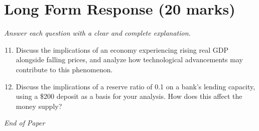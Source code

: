 \documentclass[12pt]{article}
\begin{document}
\section*{Long Form Response (20 marks)}
\textit{Answer each question with a clear and complete explanation.}
\begin{enumerate}[label=\arabic*.]
\setcounter{enumi}{10}
\item Discuss the implications of an economy experiencing rising real GDP alongside falling prices, and analyze how technological advancements may contribute to this phenomenon.
\item Discuss the implications of a reserve ratio of 0.1 on a bank's lending capacity, using a \$200 deposit as a basis for your analysis. How does this affect the money supply?
\end{enumerate}

\vfill
\noindent\textit{End of Paper}
\end{document}
